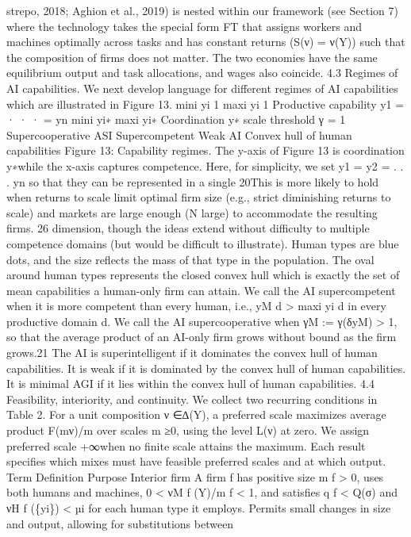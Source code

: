 strepo, 2018; Aghion et al., 2019) is nested within our framework (see Section 7) where
the technology takes the special form FT that assigns workers and machines optimally
across tasks and has constant returns (S(ν) = ν(Y)) such that the composition of
firms does not matter. The two economies have the same equilibrium output and task
allocations, and wages also coincide.
4.3 Regimes of AI capabilities. We next develop language for different regimes of
AI capabilities which are illustrated in Figure 13.
mini yi
1
maxi yi
1
Productive capability y1 = · · · = yn
mini yi∗
maxi yi∗
Coordination y∗
scale threshold γ = 1
Supercooperative
ASI
Supercompetent
Weak AI
Convex hull of human capabilities
Figure 13: Capability regimes.
The y-axis of Figure 13 is coordination y∗while the x-axis captures competence. Here,
for simplicity, we set y1 = y2 = . . . yn so that they can be represented in a single
20This is more likely to hold when returns to scale limit optimal firm size (e.g., strict diminishing
returns to scale) and markets are large enough (N large) to accommodate the resulting firms.
26
dimension, though the ideas extend without difficulty to multiple competence domains
(but would be difficult to illustrate). Human types are blue dots, and the size reflects
the mass of that type in the population. The oval around human types represents the
closed convex hull which is exactly the set of mean capabilities a human-only firm can
attain.
We call the AI supercompetent when it is more competent than every human, i.e.,
yM
d > maxi yi
d in every productive domain d. We call the AI supercooperative when
γM := γ(δyM) > 1, so that the average product of an AI-only firm grows without
bound as the firm grows.21 The AI is superintelligent if it dominates the convex hull
of human capabilities. It is weak if it is dominated by the convex hull of human
capabilities. It is minimal AGI if it lies within the convex hull of human capabilities.
4.4 Feasibility, interiority, and continuity. We collect two recurring conditions in
Table 2. For a unit composition ν ∈∆(Y), a preferred scale maximizes average product
F(mν)/m over scales m ≥0, using the level L(ν) at zero. We assign preferred scale
+∞when no finite scale attains the maximum. Each result specifies which mixes must
have feasible preferred scales and at which output.
Term
Definition
Purpose
Interior firm
A firm f has positive size m f > 0, uses
both humans and machines,
0 < νM
f (Y)/m f < 1, and satisfies
q f < Q(σ) and νH
f (\{yi\}) < µi for each
human type it employs.
Permits small changes in
size and output, allowing
for substitutions between
